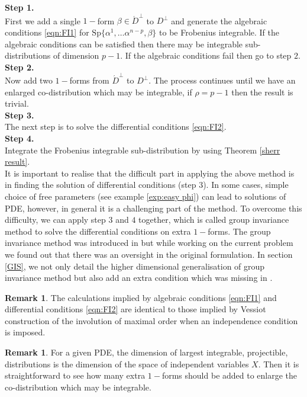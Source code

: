 \documentclass[a4paper, 11pt]{amsart}
\theoremstyle{definition}
\newtheorem{remark}[theorem]{Remark}
\begin{document}
\noindent \textbf{Step 1.}\\
First we add a single $1-$form $\beta\in \acute{D}^{\perp} $ to $D^\perp$ and generate the algebraic conditions \eqref{eqn:FI1} for ${\text{Sp}}\{\alpha^1,\ldots\alpha^{n-p},\beta\}$ to be Frobenius integrable. If the algebraic conditions can be satisfied then there may be integrable sub-distributions of dimension $p-1$. If the algebraic conditions fail then go to step $2.$\\
\noindent \textbf{Step 2.}\\
 Now add two $1-$forms from $\acute{D}^{\perp}$ to $D^\perp$. The process continues until we have an enlarged co-distribution which may be integrable, if $\rho=p-1$ then the result is trivial. \\
\noindent \textbf{Step 3.}\\
 The next step is to solve the differential conditions \eqref{eqn:FI2}.\\
\noindent\textbf{Step 4.}\label{step3:integration}\\
 Integrate the Frobenius integrable sub-distribution by using  Theorem \ref{sherr result}.\\

It is important to realise that the difficult part in applying the above method is in finding the solution of differential conditions (step $3$). In some cases, simple choice of free parameters (see example \ref{exp:easy phi}) can lead to solutions of PDE, however, in general it is a challenging part of the method. To overcome this difficulty, we  can apply step $3$ and $4$ together, which is called group invariance method to solve the differential conditions on extra $1-$forms. The group invariance method was introduced in \cite[\S 5]{NTGP13} but while working on the current problem we found out that there was an oversight in the original formulation. In section \ref{GIS}, we not only detail the higher dimensional generalisation of group invariance method but also add an extra condition which was missing in \cite[\S 5]{NTGP13}.

\begin{remark}
  The calculations implied by algebraic conditions \eqref{eqn:FI1} and differential conditions \eqref{eqn:FI2} are identical to those implied by Vessiot construction of the involution of maximal order \cite{Vessiot1924} when an independence condition is imposed.
\end{remark}
\begin{remark}
For a given PDE, the dimension of largest integrable, projectible, distributions is the dimension of the space of independent variables $X.$ Then it is straightforward to see how many extra $1-$forms should be added to enlarge the co-distribution which may be integrable.
\end{remark}
\end{document}
